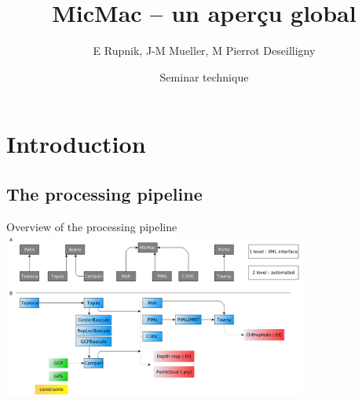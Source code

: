 \documentclass{beamer}
\title{MicMac -- un aperçu global}
\institute{IGN}
\date[25 May 2018]{Seminar technique}
\author[E Rupnik]{E Rupnik, J-M Mueller, M Pierrot Deseilligny}
\begin{document}
    \begin{frame}[plain]
        \titlepage{}
    \end{frame}

	\tableofcontents
	

	
	
      \section{Introduction}  
        \subsection*{The processing pipeline}
            \begin{frame}{Overview of the processing pipeline}
                \includegraphics[width=10cm]{images/architecture_prntscr.png}
                
                
            \end{frame}
\end{document}

